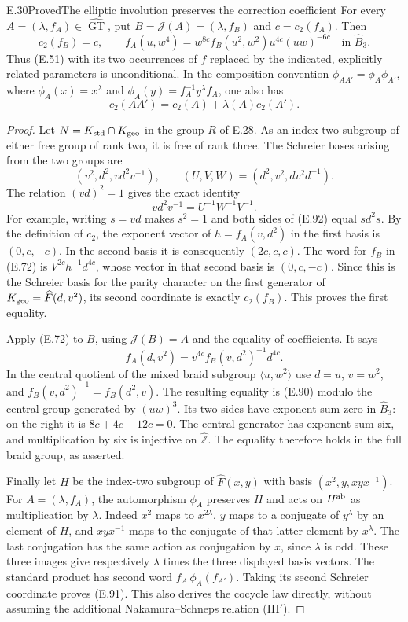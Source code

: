 \begin{result}{E.30}{Proved}{The elliptic involution preserves the correction coefficient}
For every $A=(\lambda,f_A)\in\widehat{\operatorname{GT}}$,
put $B=\mathcal J(A)=(\lambda,f_B)$ and $c=c_2(f_A)$.
Then
\[
 c_2(f_B)=c,
 \qquad
 f_A(u,w^4)=w^{8c}f_B(u^2,w^2)u^{4c}(uw)^{-6c}
       \quad\text{in }\widehat B_3.                    \tag{E.90}
\]
Thus (E.51) with its two occurrences of $f$ replaced by
the indicated, explicitly related parameters is
unconditional.  In the composition convention
$\phi_{AA'}=\phi_A\phi_{A'}$, where
$\phi_A(x)=x^\lambda$ and
$\phi_A(y)=f_A^{-1}y^\lambda f_A$, one also has
\[
 c_2(AA')=c_2(A)+\lambda(A)c_2(A').                    \tag{E.91}
\]
\end{result}
\begin{proof}
Let $N=K_{\rm std}\cap K_{\rm geo}$ in the group $R$
of E.28.  As an index-two subgroup of either free
group of rank two, it is free of rank three.
The Schreier bases arising from the two groups are
\[
 (v^2,d^2,vd^2v^{-1}),\qquad
 (U,V,W)=(d^2,v^2,dv^2d^{-1}).
\]
The relation $(vd)^2=1$ gives the exact identity
\[
                  vd^2v^{-1}=U^{-1}W^{-1}V^{-1}.
                                                               \tag{E.92}
\]
For example, writing $s=vd$ makes $s^2=1$ and both
sides of (E.92) equal $sd^2s$.
By the definition of $c_2$, the exponent vector of
$h=f_A(v,d^2)$ in the first basis is $(0,c,-c)$.
In the second basis it is consequently $(2c,c,c)$.
The word for $f_B$ in (E.72) is
$V^{2c}h^{-1}d^{4c}$, whose vector in that second
basis is $(0,c,-c)$.
Since this is the Schreier basis for the parity
character on the first generator of
$K_{\rm geo}=\widehat F(d,v^2)$, its second
coordinate is exactly $c_2(f_B)$.  This proves
the first equality.

Apply (E.72) to $B$, using
$\mathcal J(B)=A$ and the equality of coefficients.
It says
\[
 f_A(d,v^2)=v^{4c}f_B(v,d^2)^{-1}d^{4c}.
\]
In the central quotient of the mixed braid
subgroup $\langle u,w^2\rangle$ use
$d=u$, $v=w^2$, and
$f_B(v,d^2)^{-1}=f_B(d^2,v)$.
The resulting equality is (E.90) modulo the
central group generated by $(uw)^3$.
Its two sides have exponent sum zero in
$\widehat B_3$: on the right it is
$8c+4c-12c=0$.
The central generator has exponent sum six,
and multiplication by six is injective on
$\widehat{\mathbb Z}$.  The equality therefore
holds in the full braid group, as asserted.

Finally let $H$ be the index-two subgroup of
$\widehat F(x,y)$ with basis
$(x^2,y,xyx^{-1})$.
For $A=(\lambda,f_A)$, the automorphism $\phi_A$
preserves $H$ and acts on $H^{\rm ab}$ as
multiplication by $\lambda$.
Indeed $x^2$ maps to $x^{2\lambda}$,
$y$ maps to a conjugate of $y^\lambda$ by an
element of $H$, and $xyx^{-1}$ maps to the
conjugate of that latter element by $x^\lambda$.
The last conjugation has the same action as
conjugation by $x$, since $\lambda$ is odd.
These three images give respectively
$\lambda$ times the three displayed basis
vectors.  The standard product has second
word $f_A\,\phi_A(f_{A'})$.
Taking its second Schreier coordinate proves
(E.91).  This also derives the cocycle law
directly, without assuming the additional
Nakamura--Schneps relation (III$'$).
\end{proof}


